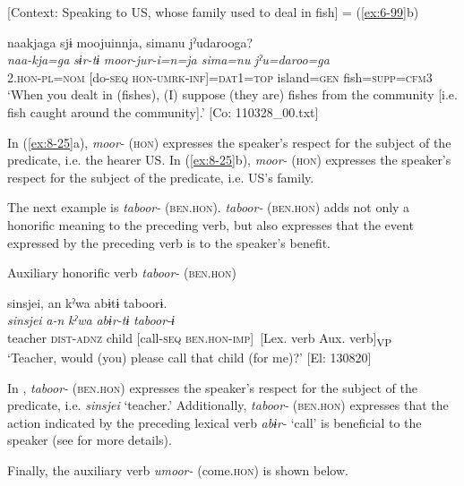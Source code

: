 \ex{} [Context: Speaking to US, whose family used to deal in fish] = (\ref{ex:6-99}b)

{\TM}
\glll  naakjaga  sjɨ  moojuinnja,  simanu jˀudarooga?\\
\textit{naa-kja=ga}  \textit{sɨr-tɨ}  \textit{moor-jur-i=n=ja  sima=nu} \textit{jˀu=daroo=ga}\\
2.\textsc{hon}-\textsc{pl}=\textsc{nom}  [do-\textsc{seq}  \textsc{hon}-\textsc{umrk}-\textsc{inf}]=\textsc{dat1}=\textsc{top}  island=\textsc{gen} fish=\textsc{supp}=\textsc{cfm3}\\
\glt ‘When you dealt in (fishes), (I) suppose (they are) fishes from the community [i.e. fish caught around the community].’ [Co: 110328\_00.txt]
\z
\z

In (\ref{ex:8-25}a), \textit{moor-} (\textsc{hon}) expresses the speaker’s respect for the subject of the predicate, i.e. the hearer US. In (\ref{ex:8-25}b), \textit{moor-} (\textsc{hon}) expresses the speaker’s respect for the subject of the predicate, i.e. US’s family.

  The next example is \textit{taboor-} (\textsc{ben}.\textsc{hon}). \textit{taboor-} (\textsc{ben}.\textsc{hon}) adds not only a honorific meaning to the preceding verb, but also expresses that the event expressed by the preceding verb is to the speaker’s benefit.

\ea\label{ex:8-26}
  Auxiliary honorific verb \textit{taboor-} (\textsc{ben}.\textsc{hon})

  {\TM}
\glll  {\textbar}sinsjei{\textbar},  an  kˀwa  abɨtɨ  taboorɨ.\\
\textit{sinsjei}  \textit{a-n}  \textit{kˀwa}  \textit{abɨr-tɨ}  \textit{taboor-ɨ}\\
teacher  \textsc{dist}-\textsc{adnz}  child  [call-\textsc{seq}  \textsc{ben}.\textsc{hon}-\textsc{imp}]\
          {}[Lex. verb  Aux. verb]\textsubscript{VP}\\
\glt ‘Teacher, would (you) please call that child (for me)?’ [El: 130820]
\z

In , \textit{taboor-} (\textsc{ben}.\textsc{hon}) expresses the speaker’s respect for the subject of the predicate, i.e. \textit{sinsjei} ‘teacher.’ Additionally, \textit{taboor-} (\textsc{ben}.\textsc{hon}) expresses that the action indicated by the preceding lexical verb \textit{abɨr-} ‘call’ is beneficial to the speaker (see  for more details).

  Finally, the auxiliary verb \textit{umoor-} (come.\textsc{hon}) is shown below.

